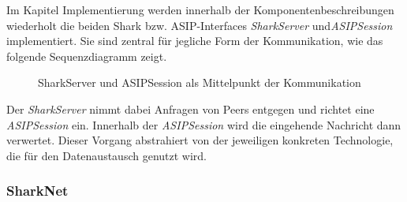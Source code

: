 Im Kapitel Implementierung werden innerhalb der Komponentenbeschreibungen wiederholt die beiden Shark bzw. ASIP-Interfaces \textit{SharkServer} und\textit{ASIPSession} implementiert. Sie sind zentral für jegliche Form der Kommunikation, wie das folgende Sequenzdiagramm zeigt.
\begin{figure}[H]
	\centering
	\hspace*{1cm}
	\caption{SharkServer und ASIPSession als Mittelpunkt der Kommunikation}
	\label{fig:sharkCommunication}
\end{figure}
Der \textit{SharkServer} nimmt dabei Anfragen von Peers entgegen und richtet eine \textit{ASIPSession} ein. Innerhalb der \textit{ASIPSession} wird die eingehende Nachricht dann verwertet. Dieser Vorgang abstrahiert von der jeweiligen konkreten Technologie, die für den Datenaustausch genutzt wird. 
\newpage

\subsubsection{SharkNet}

